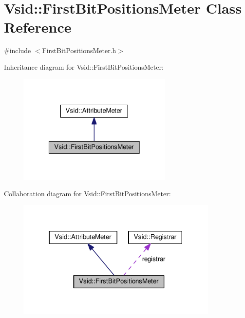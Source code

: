 \hypertarget{class_vsid_1_1_first_bit_positions_meter}{\section{Vsid\-:\-:First\-Bit\-Positions\-Meter Class Reference}
\label{class_vsid_1_1_first_bit_positions_meter}
}


{\ttfamily \#include $<$First\-Bit\-Positions\-Meter.\-h$>$}



Inheritance diagram for Vsid\-:\-:First\-Bit\-Positions\-Meter\-:
\nopagebreak
\begin{figure}[H]
\begin{center}
\leavevmode
\includegraphics[width=218pt]{class_vsid_1_1_first_bit_positions_meter__inherit__graph}
\end{center}
\end{figure}


Collaboration diagram for Vsid\-:\-:First\-Bit\-Positions\-Meter\-:
\nopagebreak
\begin{figure}[H]
\begin{center}
\leavevmode
\includegraphics[width=284pt]{class_vsid_1_1_first_bit_positions_meter__coll__graph}
\end{center}
\end{figure}
